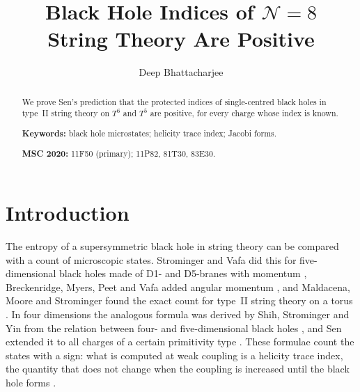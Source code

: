 \documentclass[11pt]{amsart}
\theoremstyle{definition}
\begin{document}
\title[Black hole indices of $\mathcal N=8$ string theory are positive]{Black Hole Indices of $\mathcal{N}=8$\\ String Theory Are Positive}

\author{Deep Bhattacharjee}
\address{Formerly, Electro-Gravitational Space Propulsion Laboratory (EGSPL), Bhubaneswar, Odisha 751030, India}
\address{Formerly, University of Calcutta (Heramba Chandra College), 23/49 Gariahat Road, Golpark, Kolkata 700029, West Bengal, India}

\begin{abstract}
We prove Sen's prediction that the protected indices of single-centred black holes in type~II string theory on $T^6$ and $T^5$ are positive, for every charge whose index is known.

\medskip\noindent\textbf{Keywords:} black hole microstates; helicity trace index; Jacobi forms.

\smallskip\noindent\textbf{MSC 2020:} 11F50 (primary); 11P82, 81T30, 83E30.
\end{abstract}

\maketitle

\section{Introduction}\label{sec:intro}

The entropy of a supersymmetric black hole in string theory can be compared with a count of microscopic states. Strominger and Vafa did this for five-dimensional black holes made of D1- and D5-branes with momentum \cite{SV96}, Breckenridge, Myers, Peet and Vafa added angular momentum \cite{BMPV97}, and Maldacena, Moore and Strominger found the exact count for type~II string theory on a torus \cite{MMS99}. In four dimensions the analogous formula was derived by Shih, Strominger and Yin from the relation between four- and five-dimensional black holes \cite{GSY06,SSY06}, and Sen extended it to all charges of a certain primitivity type \cite{Sen08b,Sen10}. These formulae count the states with a sign: what is computed at weak coupling is a helicity trace index, the quantity that does not change when the coupling is increased until the black hole forms \cite{BK97,BFKOV98,KO97,Sen08r}.
\end{document}
